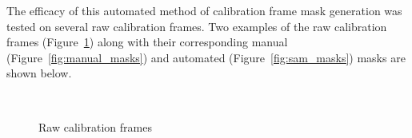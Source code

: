 The efficacy of this automated method of calibration frame mask generation was tested on
several raw calibration frames.
Two examples of the raw calibration frames (Figure~\ref{fig:raw_frames}) along with their
corresponding manual (Figure~\ref{fig:manual_masks}) and automated (Figure~\ref{fig:sam_masks})
masks are shown below.

\begin{figure}[htbp]
    \centering
    \\[1mm]
    \caption{Raw calibration frames}
    \label{fig:raw_frames}
\end{figure}

